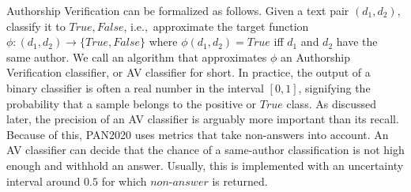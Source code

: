Authorship Verification can be formalized as follows.
Given a text pair $(d_1, d_2)$, classify it to ${True, False}$, i.e.,\ approximate the target function $\phi{}:(d_1, d_2)\to\{True, False\}$ where $\phi(d_1, d_2)=True$ iff $d_1$ and $d_2$ have the same author.
We call an algorithm that approximates $\phi$ an Authorship Verification classifier, or AV classifier for short.
In practice, the output of a binary classifier is often a real number in the interval $[0,1]$, signifying the probability that a sample belongs to the positive or $True$ class.
As discussed later, the precision of an AV classifier is arguably more important than its recall.
Because of this, PAN2020 uses metrics that take non-answers into account.
An AV classifier can decide that the chance of a same-author classification is not high enough and withhold an answer.
Usually, this is implemented with an uncertainty interval around $0.5$ for which $non\text{-}answer$ is returned.


